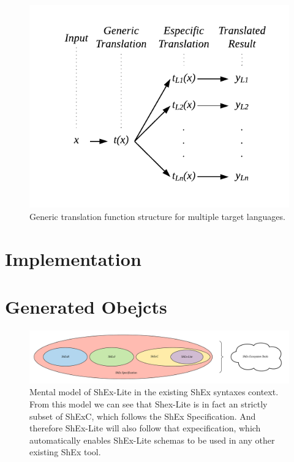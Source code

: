 \begin{figure}
    \includegraphics{images/translation-function.pdf}
    \centering
	\caption[Generic translation function structure]{Generic translation function structure for multiple
	target languages.}
    \label{fig:translation-function}
\end{figure}

\section{Implementation}

\section{Generated Obejcts}

\begin{figure}
    \includegraphics[width=\textwidth]{images/shex-lite-syntaxes-mental-model.png}
    \centering
    \caption[Mental model of ShEx-Lite in the existing ShEx syntaxes context.]{Mental model of
    ShEx-Lite in the existing ShEx syntaxes context. From this model we can see that Shex-Lite
    is in fact an strictly subset of ShExC, which follows the ShEx Specification. And therefore
    ShEx-Lite will also follow that expecification, which automatically enables ShEx-Lite schemas
    to be used in any other existing ShEx tool.}
    \label{fig:syntax-mental-model}
\end{figure}

